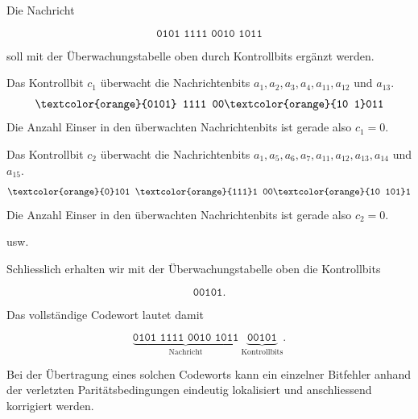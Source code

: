 \begin{myexample}
	Die Nachricht

	\[
		\texttt{0101 1111 0010 1011}
	\]

	soll mit der Überwachungstabelle oben durch Kontrollbits ergänzt werden.

	Das Kontrollbit \(c_1\) überwacht die Nachrichtenbits \(a_1, a_2, a_3, a_4, a_{11}, a_{12}\) und \(a_{13}\).
	\[
		\texttt{\textcolor{orange}{0101} 1111 00\textcolor{orange}{10 1}011}
	\]
	Die Anzahl Einser in den überwachten Nachrichtenbits ist gerade also \(c_1 = 0\).


	Das Kontrollbit \(c_2\) überwacht die Nachrichtenbits \(a_1, a_5, a_6, a_7, a_{11}, a_{12}, a_{13}, a_{14}\) und \(a_{15}\).
	\[
		\texttt{\textcolor{orange}{0}101 \textcolor{orange}{111}1 00\textcolor{orange}{10 101}1}
	\]
	Die Anzahl Einser in den überwachten Nachrichtenbits ist gerade also \(c_2 = 0\).

	usw.

	Schliesslich erhalten wir mit der Überwachungstabelle oben
	die Kontrollbits

	\[
		\texttt{00101}.
	\]

	Das vollständige Codewort lautet damit

	\[
		\underbrace{\texttt{0101 1111 0010 1011}}_{\text{Nachricht}}
		\ \underbrace{\texttt{00101}}_{\text{Kontrollbits}}.
	\]

	Bei der Übertragung eines solchen Codeworts kann ein einzelner
	Bitfehler anhand der verletzten Paritätsbedingungen eindeutig
	lokalisiert und anschliessend korrigiert werden.
\end{myexample}


